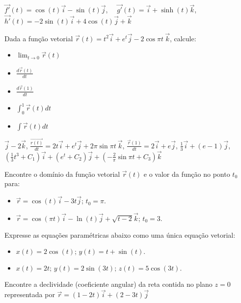 \begin{resp} $\vec{f'}(t)=\cos(t)\vec{i}-\sin(t)\vec{j}$,~~ $\vec{g'}(t)= \vec{i}+\sinh(t)\vec{k}$, ~~$\vec{h'}(t)=-2\sin(t)\vec{i}+4\cos(t)\vec{j}+\vec{k}$
\end{resp}
\begin{exer} Dada a função vetorial $\vec{r}(t)=t^2\vec{i}+e^t\vec{j}-2\cos\pi t ~\! \vec{k}$, calcule:
\begin{itemize}
\item [a)] $\displaystyle \lim_{t\to 0} \vec{r}(t)$
\item [b)] $\displaystyle \frac{d \vec{r}(t)}{dt}$
\item [c)] $\displaystyle \frac{d\vec{r}(1)}{dt}$
\item [d)] $\displaystyle \int_0^1 \vec{r}(t)dt$
\item [e)] $\displaystyle \int \vec{r}(t)dt$
\end{itemize}
\end{exer}
\begin{resp} $\vec{j}-2\vec{k}$, $\frac{\vec{r(t)}}{dt}=2t\vec{i}+e^t\vec{j}+2\pi\sin\pi t ~\! \vec{k}$, $\frac{\vec{r}(1)}{dt}=2\vec{i}+e\vec{j}$, $\frac{1}{3}\vec{i}+(e-1)\vec{j}$, $\left(\frac{1}{3}t^3+C_1\right)\vec{i}+\left(e^t+C_2\right)\vec{j}+\left(-\frac{2}{\pi}\sin\pi t+C_3\right)\vec{k}$
\end{resp}
\begin{exer}Encontre o domínio da função vetorial $\vec{r}(t)$ e o valor da função no ponto $t_0$ para:
\begin{itemize}
 \item[a)] $\vec{r}=\cos(t)\vec{i}-3t\vec{j}$; $t_0=\pi$.
 \item[b)] $\vec{r}=\cos(\pi t)\vec{i}-\ln(t)\vec{j}+\sqrt{t-2} \vec{k}$; $t_0=3$.
\end{itemize}
\end{exer}
\begin{exer}Expresse as equações paramétricas abaixo como uma única equação vetorial:
\begin{itemize}
 \item[a)] $x(t)=2\cos(t)$; $y(t)=t+\sin(t)$.
 \item[b)] $x(t)=2t$; $y(t)=2\sin(3t)$; $z(t)=5\cos(3t)$.
\end{itemize}
\end{exer}
\begin{exer}Encontre a declividade (coeficiente angular) da reta contida no plano $z=0$ representada por $\vec{r}=(1-2t)\vec{i}+(2-3t)\vec{j}$
\end{exer}
